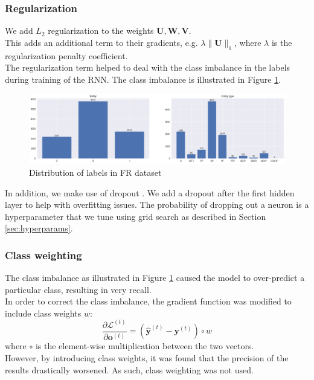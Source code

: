 \documentclass{article}
\numberwithin{equation}{section}
\begin{document}
\subsubsection{Regularization}
We add $L_2$ regularization to the weights $\bm{U}, \bm{W}, \bm{V}$.\\
This adds an additional term to their gradients, e.g. $\lambda \lVert\bm{U}\rVert_1$, where $\lambda$ is the regularization penalty coefficient.\\

The regularization term helped to deal with the class imbalance in the labels during training of the RNN. The class imbalance is illustrated in Figure \ref{fig:class-labels}.

\begin{figure}[h]
	\centering
	\includegraphics[width=0.9\linewidth]{assets/class_labels.png}
	\caption{Distribution of labels in FR dataset}
	\label{fig:class-labels}
\end{figure}

In addition, we make use of dropout \cite{srivastava2014dropout}. We add a dropout after the first hidden layer to help with overfitting issues. The probability of dropping out a neuron is a hyperparameter that we tune using grid search as described in Section \ref{sec:hyperparams}.

\subsubsection{Class weighting}
The class imbalance as illustrated in Figure \ref{fig:class-labels} caused the model to over-predict a particular class, resulting in very recall.\\

In order to correct the class imbalance, the gradient function was modified to include class weights $w$:
	$$ \frac{\partial \mathcal{L}^{(t)}}{\partial \bm{o}^{(t)}}
		= (\hat{\bm{y}}^{(t)} - \bm{y}^{(t)}) \circ w $$
where $\circ$ is the element-wise multiplication between the two vectors.\\

However, by introducing class weights, it was found that the precision of the results drastically worsened. As such, class weighting was not used.
\end{document}
